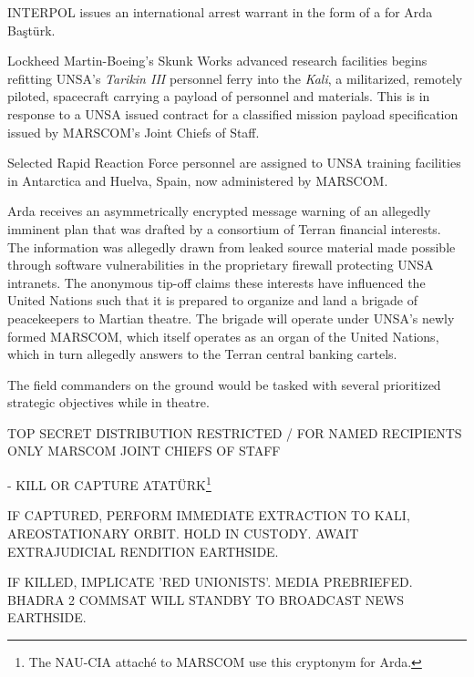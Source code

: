 INTERPOL issues an international arrest warrant in the form of a  for Arda Baştürk.
\StopTimelineDate

Lockheed Martin-Boeing's Skunk Works advanced research facilities begins refitting UNSA's {\it Tarikin III} personnel ferry into the {\it Kali}, a militarized, remotely piloted, spacecraft carrying a payload of personnel and materials. This is in response to a UNSA issued contract for a classified mission payload specification issued by MARSCOM's Joint Chiefs of Staff.
\StopTimelineDate

Selected Rapid Reaction Force personnel are assigned to UNSA training facilities in Antarctica and Huelva, Spain, now administered by MARSCOM.
\StopTimelineDate

Arda receives an asymmetrically encrypted message warning of an allegedly imminent plan that was drafted by a consortium of Terran financial interests. The information was allegedly drawn from leaked source material made possible through software vulnerabilities in the proprietary firewall protecting UNSA intranets. The anonymous tip-off claims these interests have influenced the United Nations such that it is prepared to organize and land a brigade of peacekeepers to Martian theatre. The brigade will operate under UNSA's newly formed MARSCOM, which itself operates as an organ of the United Nations, which in turn allegedly answers to the Terran central banking cartels. 

The field commanders on the ground would be tasked with several prioritized strategic objectives while in theatre. 

\startTimelineCorrespondenceDocument
TOP SECRET
DISTRIBUTION RESTRICTED / FOR NAMED RECIPIENTS ONLY
MARSCOM JOINT CHIEFS OF STAFF
\startitemize[4]
\item {} - KILL OR CAPTURE ATATÜRK\footnote{The NAU-CIA attaché to MARSCOM use this cryptonym for Arda.}

    \startitemize[n]
    \item IF CAPTURED, PERFORM IMMEDIATE EXTRACTION TO KALI, AREOSTATIONARY ORBIT. HOLD IN CUSTODY. AWAIT EXTRAJUDICIAL RENDITION EARTHSIDE.
    \item IF KILLED, IMPLICATE 'RED UNIONISTS'. MEDIA PREBRIEFED. BHADRA 2 COMMSAT WILL STANDBY TO BROADCAST NEWS EARTHSIDE.
    \stopitemize

